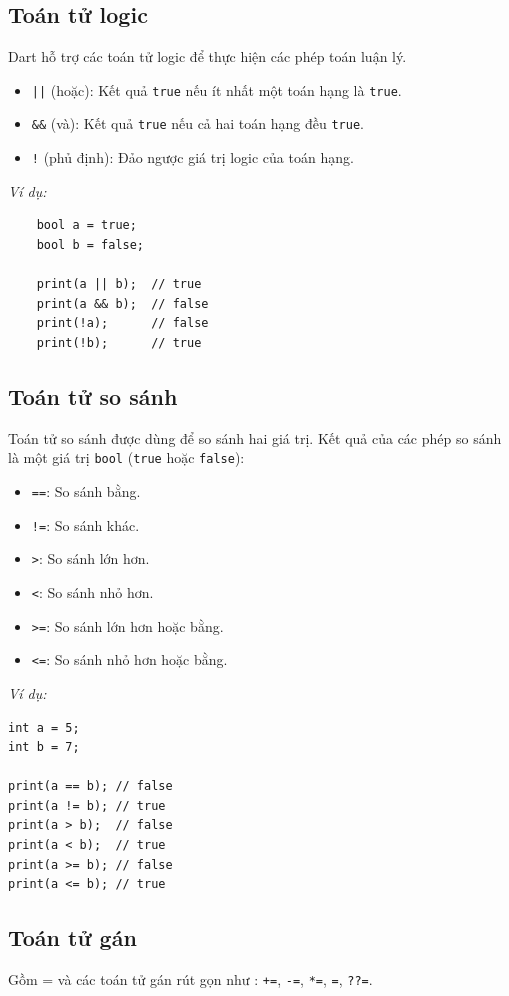 \documentclass[../DoAn.tex]{subfiles}
\numberwithin{figure}{chapter}
\begin{document}
\subsection{Toán tử logic}
Dart hỗ trợ các toán tử logic để thực hiện các phép toán luận lý.
\begin{itemize}
    \item \texttt{||} (hoặc): Kết quả \texttt{true} nếu ít nhất một toán hạng là \texttt{true}.
    \item \texttt{\&\&} (và): Kết quả \texttt{true} nếu cả hai toán hạng đều \texttt{true}.
    \item \texttt{!} (phủ định): Đảo ngược giá trị logic của toán hạng.
\end{itemize}

\textit{Ví dụ:}
\begin{lstlisting}
    bool a = true;
    bool b = false;
    
    print(a || b);  // true
    print(a && b);  // false
    print(!a);      // false
    print(!b);      // true
\end{lstlisting}

\subsection{Toán tử so sánh}
Toán tử so sánh được dùng để so sánh hai giá trị. Kết quả của các phép so sánh là một giá trị \texttt{bool} (\texttt{true} hoặc \texttt{false}):
\begin{itemize}
    \item \texttt{==}: So sánh bằng.
    \item \texttt{!=}: So sánh khác.
    \item \texttt{>}: So sánh lớn hơn.
    \item \texttt{<}: So sánh nhỏ hơn.
    \item \texttt{>=}: So sánh lớn hơn hoặc bằng.
    \item \texttt{<=}: So sánh nhỏ hơn hoặc bằng.
\end{itemize}

\textit{Ví dụ:}
\begin{lstlisting}
int a = 5;
int b = 7;

print(a == b); // false
print(a != b); // true
print(a > b);  // false
print(a < b);  // true
print(a >= b); // false
print(a <= b); // true
\end{lstlisting}

\subsection{Toán tử gán}
Gồm = và các toán tử gán rút gọn như : \texttt{+=}, \texttt{-=}, 
\texttt{*=}, \texttt{\/=}, \texttt{??=}. 
\end{document}
